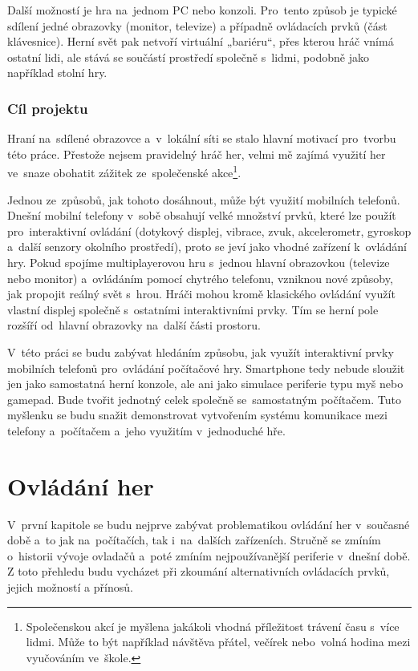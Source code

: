 \documentclass[thesis=B,czech,hidelinks]{FITthesis}[2012/06/26] %
\begin{document}
\begin{introduction}
Další možností je hra na~jednom PC nebo konzoli. Pro~tento způsob je typické sdílení jedné obrazovky (monitor, televize) a případně ovládacích prvků (část klávesnice). Herní svět pak netvoří virtuální „bariéru“, přes kterou hráč vnímá ostatní lidi, ale stává se součástí prostředí společně s~lidmi, podobně jako například stolní hry.

\subsection{Cíl projektu}

Hraní na~sdílené obrazovce a~v~lokální síti se stalo hlavní motivací pro~tvorbu této práce. Přestože nejsem pravidelný hráč her, velmi mě zajímá využití her ve~snaze obohatit zážitek ze~společenské akce\footnote{Společenskou akcí je myšlena jakákoli vhodná příležitost trávení času s~více lidmi. Může to být například návštěva přátel, večírek nebo~volná hodina mezi vyučováním ve~škole.}. 

Jednou ze~způsobů, jak tohoto dosáhnout, může být využití mobilních telefonů. Dnešní mobilní telefony v~sobě obsahují velké množství prvků, které lze použít pro~interaktivní ovládání (dotykový displej, vibrace, zvuk, akcelerometr, gyroskop a~další senzory okolního prostředí), proto se jeví jako vhodné zařízení k~ovládání hry. Pokud spojíme multiplayerovou hru s~jednou hlavní obrazovkou (televize nebo monitor) a~ovládáním pomocí chytrého telefonu, vzniknou nové způsoby, jak propojit reálný svět s~hrou. Hráči mohou kromě klasického ovládání využít vlastní displej společně s~ostatními interaktivními prvky. Tím se herní pole rozšíří od~hlavní obrazovky na~další části prostoru.

V~této práci se budu zabývat hledáním způsobu, jak využít interaktivní prvky mobilních telefonů pro~ovládání počítačové hry. Smartphone tedy nebude sloužit jen jako samostatná herní konzole, ale ani jako simulace periferie typu myš nebo gamepad. Bude tvořit jednotný celek společně se~samostatným počítačem. Tuto myšlenku se budu snažit demonstrovat vytvořením systému komunikace mezi telefony a~počítačem a~jeho využitím v~jednoduché hře.

\end{introduction}

\chapter{Ovládání her}

V~první kapitole se budu nejprve zabývat problematikou ovládání her v~současné době a~to jak na~počítačích, tak i~na~dalších zařízeních. Stručně se zmíním o~historii vývoje ovladačů a~poté zmíním nejpoužívanější periferie v~dnešní době. Z toto přehledu budu vycházet při zkoumání alternativních ovládacích prvků, jejich možností a přínosů.
 
\end{document}
